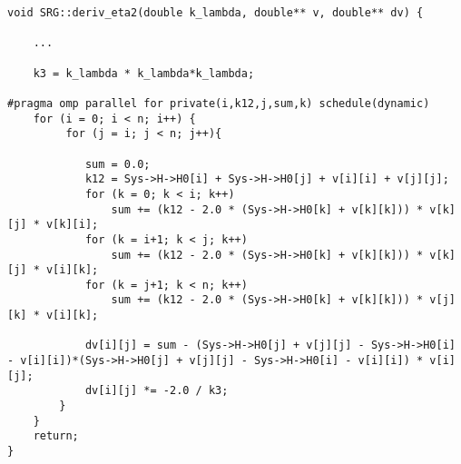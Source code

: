 \begin{lstlisting}[float,caption={Derivative function for Wegner's generator $\hat{\eta}_2$. The function has the same signature as for generator $\hat{\eta}_1$, receiving the current interaction elements at \textit{k\_lambda} in the array  \textit{v} and returning the corresponding derivatives in the array \textit{dv}. The calculation is performed according to Eq.~(\ref{eq:flowWegner}).}, label={lst:eta3}]
void SRG::deriv_eta2(double k_lambda, double** v, double** dv) {

	...
	
    k3 = k_lambda * k_lambda*k_lambda;

#pragma omp parallel for private(i,k12,j,sum,k) schedule(dynamic)
    for (i = 0; i < n; i++) {
         for (j = i; j < n; j++){

            sum = 0.0;
            k12 = Sys->H->H0[i] + Sys->H->H0[j] + v[i][i] + v[j][j];
            for (k = 0; k < i; k++)
                sum += (k12 - 2.0 * (Sys->H->H0[k] + v[k][k])) * v[k][j] * v[k][i];
            for (k = i+1; k < j; k++)
                sum += (k12 - 2.0 * (Sys->H->H0[k] + v[k][k])) * v[k][j] * v[i][k];
            for (k = j+1; k < n; k++)
                sum += (k12 - 2.0 * (Sys->H->H0[k] + v[k][k])) * v[j][k] * v[i][k];

            dv[i][j] = sum - (Sys->H->H0[j] + v[j][j] - Sys->H->H0[i] - v[i][i])*(Sys->H->H0[j] + v[j][j] - Sys->H->H0[i] - v[i][i]) * v[i][j];
            dv[i][j] *= -2.0 / k3;
        }
    }
    return;
}
\end{lstlisting}

